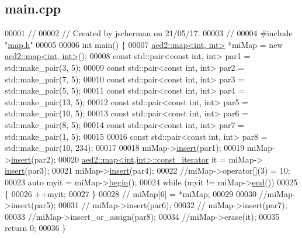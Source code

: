 \hypertarget{main_8cpp_source}{}\subsection{main.\+cpp}

\begin{DoxyCode}
00001 \textcolor{comment}{//}
00002 \textcolor{comment}{// Created by jscherman on 21/05/17.}
00003 \textcolor{comment}{//}
00004 \textcolor{preprocessor}{#include "\hyperlink{map_8h}{map.h}"}
00005 
00006 \textcolor{keywordtype}{int} main() \{
00007     \hyperlink{classaed2_1_1map}{aed2::map<int, int>} *miMap = \textcolor{keyword}{new} \hyperlink{classaed2_1_1map}{aed2::map<int, int>}();
00008     \textcolor{keyword}{const} std::pair<const int, int> par1 = std::make\_pair(3, 5);
00009     \textcolor{keyword}{const} std::pair<const int, int> par2 = std::make\_pair(7, 5);
00010     \textcolor{keyword}{const} std::pair<const int, int> par3 = std::make\_pair(5, 5);
00011     \textcolor{keyword}{const} std::pair<const int, int> par4 = std::make\_pair(13, 5);
00012     \textcolor{keyword}{const} std::pair<const int, int> par5 = std::make\_pair(10, 5);
00013     \textcolor{keyword}{const} std::pair<const int, int> par6 = std::make\_pair(8, 5);
00014     \textcolor{keyword}{const} std::pair<const int, int> par7 = std::make\_pair(1, 5);
00015 
00016     \textcolor{keyword}{const} std::pair<const int, int> par8 = std::make\_pair(10, 234);
00017 
00018     miMap->\hyperlink{classaed2_1_1map_a6941cde9a79c27f054b5c97a587a1854_a6941cde9a79c27f054b5c97a587a1854}{insert}(par1);
00019     miMap->\hyperlink{classaed2_1_1map_a6941cde9a79c27f054b5c97a587a1854_a6941cde9a79c27f054b5c97a587a1854}{insert}(par2);
00020     \hyperlink{classaed2_1_1map_1_1const__iterator}{aed2::map<int,int>::const\_iterator} it = miMap->
      \hyperlink{classaed2_1_1map_a6941cde9a79c27f054b5c97a587a1854_a6941cde9a79c27f054b5c97a587a1854}{insert}(par3);
00021     miMap->\hyperlink{classaed2_1_1map_a6941cde9a79c27f054b5c97a587a1854_a6941cde9a79c27f054b5c97a587a1854}{insert}(par4);
00022     \textcolor{comment}{//miMap->operator[](3) = 10;}
00023     \textcolor{keyword}{auto} myit = miMap->\hyperlink{classaed2_1_1map_a58a95705d54b3dda7f775ce5a22225cb_a58a95705d54b3dda7f775ce5a22225cb}{begin}();
00024     \textcolor{keywordflow}{while} (myit != miMap->\hyperlink{classaed2_1_1map_a76023e6a56cb625513e1b5ea028bf983_a76023e6a56cb625513e1b5ea028bf983}{end}())
00025     \{
00026         ++myit;
00027     \}
00028    \textcolor{comment}{// miMap[6] = *miMap;}
00029 
00030     \textcolor{comment}{//miMap->insert(par5);}
00031    \textcolor{comment}{// miMap->insert(par6);}
00032    \textcolor{comment}{// miMap->insert(par7);}
00033     \textcolor{comment}{//miMap->insert\_or\_assign(par8);}
00034     \textcolor{comment}{//miMap->erase(it);}
00035     \textcolor{keywordflow}{return} 0;
00036 \}
\end{DoxyCode}
